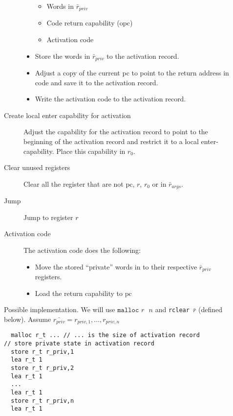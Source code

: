\documentclass[a4paper]{article}
\newcommand{\var}[1]{\mathit{#1}}
\newcommand{\pcreg}{\mathrm{pc}}
\begin{document}
\begin{description}
\begin{description}
\begin{itemize}
\begin{itemize}
                    \item Words in $\bar{r}_{\var{priv}}$
                    \item Code return capability (opc)
                    \item Activation code
                    \end{itemize}
                  \item Store the words in $\bar{r}_{\var{priv}}$ to the activation record. 
                  \item Adjust a copy of the current pc to point to the return address in code and save it to the activation record.
                  \item Write the activation code to the activation record.
                  \end{itemize}
                \item [Create local enter capability for activation] Adjust the capability for the activation record to point to the beginning of the activation record and restrict it to a local enter-capability. Place this capability in $r_0$.
                \item [Clear unused registers]
                  Clear all the register that are not $\pcreg$, $r$, $r_0$ or in $\bar{r}_{\var{args}}$.
                \item [Jump] Jump to register $r$
                \item [Activation code] The activation code does the following:
                  \begin{itemize}
                  \item Move the stored ``private'' words in to their respective $\bar{r}_{\var{priv}}$ registers.
                  \item Load the return capability to $\pcreg$
                  \end{itemize}
                \end{description} 
Possible implementation. We will use $\texttt{malloc $r$ $n$}$ and \texttt{rclear $\bar{r}$} (defined below). Assume $\bar{r_{\var{priv}}} = r_{\var{priv},1}, \dots, r_{\var{priv},n}$
\begin{lstlisting}
  malloc r_t ... // ... is the size of activation record
// store private state in activation record
  store r_t r_priv,1
  lea r_t 1
  store r_t r_priv,2
  lea r_t 1
  ...
  lea r_t 1
  store r_t r_priv,n
  lea r_t 1

\end{lstlisting}
\end{description}
\end{document}
